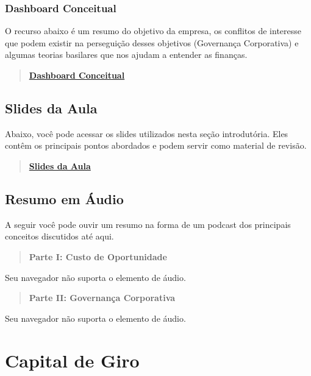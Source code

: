 \documentclass[
  a4paper,
]{book}
\begin{document}
\subsection{Dashboard Conceitual}\label{dashboard-conceitual-1}

O recurso abaixo é um resumo do objetivo da empresa, os conflitos de
interesse que podem existir na perseguição desses objetivos (Governança
Corporativa) e algumas teorias basilares que nos ajudam a entender as
finanças.

\begin{quote}
\href{./resources/01-teorias-interativo.html}{\textbf{Dashboard
Conceitual}}
\end{quote}

\section{Slides da Aula}\label{slides-da-aula}

Abaixo, você pode acessar os slides utilizados nesta seção introdutória.
Eles contêm os principais pontos abordados e podem servir como material
de revisão.

\begin{quote}
\href{./resources/01-intro-ppt.html}{\textbf{Slides da Aula}}
\end{quote}

\section{Resumo em Áudio}\label{resumo-em-uxe1udio}

A seguir você pode ouvir um resumo na forma de um podcast dos principais
conceitos discutidos até aqui.

\begin{quote}
\textbf{Parte I: Custo de Oportunidade}
\end{quote}

Seu navegador não suporta o elemento de áudio.

\begin{quote}
\textbf{Parte II: Governança Corporativa}
\end{quote}

Seu navegador não suporta o elemento de áudio.


\chapter{Capital de Giro}\label{sec-giro}
\end{document}
